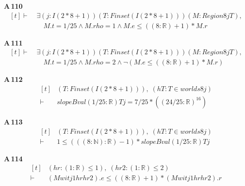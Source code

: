 \noindent\textbf{A\,110}\quad{}
{\footnotesize\[ \begin{aligned}[t]
\vdash\;&\exists (\mathit{j} : \mathit{I} (2*8+1)) (\mathit{T} : \mathit{Finset} (\mathit{I} (2*8+1))) (\mathit{M} : \mathit{Region} 8 \mathit{j} \mathit{T}),\\
&\quad \mathit{M}.\mathit{t} = 1/25 \wedge \mathit{M}.\mathit{rho} = 1 \wedge \mathit{M}.\mathit{e} \leq ((8:\mathbb{R} )+1)*\mathit{M}.\mathit{r}
\end{aligned} \]}

\noindent\textbf{A\,111}\quad{}
{\footnotesize\[ \begin{aligned}[t]
\vdash\;&\exists (\mathit{j} : \mathit{I} (2*8+1)) (\mathit{T} : \mathit{Finset} (\mathit{I} (2*8+1))) (\mathit{M} : \mathit{Region} 8 \mathit{j} \mathit{T}),\\
&\quad \mathit{M}.\mathit{t} = 1/25 \wedge \mathit{M}.\mathit{rho} = 2 \wedge \neg (\mathit{M}.\mathit{e} \leq ((8:\mathbb{R} )+1)*\mathit{M}.\mathit{r})
\end{aligned} \]}

\noindent\textbf{A\,112}\quad{}
{\footnotesize\[ \begin{aligned}[t]
&(\mathit{T} : \mathit{Finset} (\mathit{I} (2*8+1))),\; (\mathit{hT} : \mathit{T} \in \mathit{worlds} 8 \mathit{j})\\
\vdash\;&\mathit{slopeBval} (1/25 : \mathbb{R} ) \mathit{T} \mathit{j} = 7/25*((24/25:\mathbb{R} )^{16})
\end{aligned} \]}

\noindent\textbf{A\,113}\quad{}
{\footnotesize\[ \begin{aligned}[t]
&(\mathit{T} : \mathit{Finset} (\mathit{I} (2*8+1))),\; (\mathit{hT} : \mathit{T} \in \mathit{worlds} 8 \mathit{j})\\
\vdash\;&1 \leq (((8:\mathbb{N} ):\mathbb{R} )-1)*\mathit{slopeBval} (1/25 : \mathbb{R} ) \mathit{T} \mathit{j}
\end{aligned} \]}

\noindent\textbf{A\,114}\quad{}
{\footnotesize\[ \begin{aligned}[t]
&(\mathit{hr} : (1:\mathbb{R} ) \leq 1),\; (\mathit{hr2} : (1:\mathbb{R} ) \leq 2)\\
\vdash\;&(\mathit{Mwit} \mathit{j} 1 \mathit{hr} \mathit{hr2}).\mathit{e} \leq ((8:\mathbb{R} )+1)*(\mathit{Mwit} \mathit{j} 1 \mathit{hr} \mathit{hr2}).\mathit{r}
\end{aligned} \]}

